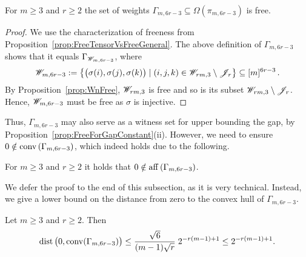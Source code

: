 \begin{prop} \label{prop:FreenessDTensors}
	For $m \geq 3$ and $r \geq 2$ the set of weights $\Gamma_{m,6r-3} \subseteq \Omega(\pi_{m,6r-3})$ is free.
\end{prop}

\begin{proof}
	We use the characterization of freeness from Proposition~\ref{prop:FreeTensorVsFreeGeneral}. The above definition of $\Gamma_{m, 6r-3}$ shows that it equals $\Gamma_{\mathscr{W}_{m, 6r - 3}}$, where
		\[ \mathscr{W}_{m, 6r - 3} := \big\{ \big(\sigma(i), \sigma(j), \sigma(k) \big) \mid (i,j,k) \in \mathscr{W}_{rm, 3} \setminus \mathscr{J}_{r} \big\}
		\subseteq [m]^{6r - 3} \, . \]
	By Proposition~\ref{prop:WnFree}, $\mathscr{W}_{r m, 3 }$ is free and so is its subset $\mathscr{W}_{r m, 3} \setminus \mathscr{J}_r$. Hence, $\mathscr{W}_{m, 6r - 3}$ must be free as $\sigma$ is injective.
\end{proof}

Thus, $\Gamma_{m, 6r-3}$ may also serve as a witness set for upper bounding the gap, by Proposition~\ref{prop:FreeForGapConstant}(ii). However, we need to ensure $0 \notin \operatorname{conv} \left( \Gamma_{m, 6 r - 3} \right)$, which indeed holds due to the following.

\begin{lemma} \label{lem:convStackingKravtsov}
	For $m \geq 3$ and $r \geq 2$ it holds that $0 \notin \operatorname{aff} \left( \Gamma_{m, 6 r - 3} \right)$.
\end{lemma}

We defer the proof to the end of this subsection, as it is very technical. Instead, we give a lower bound on the distance from zero to the convex hull of $\Gamma_{m, 6r - 3}$.

\begin{lemma} \label{lem:distStackingKravtsov}
	Let $m \geq 3$ and $r \geq 2$. Then 
	\begin{align*}
		\operatorname{dist} \big(0, \operatorname{conv}(\Gamma_{m,6 r - 3}) \big) \leq \frac{\sqrt{6}}{(m-1)\sqrt{r}} \; 2^{-r(m-1) + 1} \leq 2^{- r (m-1) + 1} .
	\end{align*}
\end{lemma}

